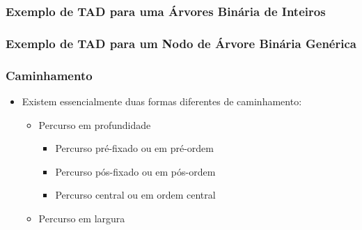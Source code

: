\documentclass[aspectratio=169]{beamer}
\begin{document}
\begin{frame}\frametitle{Exemplo de TAD para uma Árvores Binária de Inteiros}
\fontsize{3pt}{5pt}\selectfont{

}
\end{frame}

\begin{frame}[fragile]\frametitle{Exemplo de TAD para um Nodo de Árvore Binária Genérica}
\fontsize{3pt}{5pt}\selectfont{

}
\end{frame}

\begin{frame}\frametitle{Caminhamento}
\begin{itemize}
	\item Existem essencialmente duas formas diferentes de caminhamento:
	\begin{itemize}
		\item Percurso em profundidade
		\begin{itemize}
			\item Percurso pré-fixado ou em pré-ordem
			\item Percurso pós-fixado ou em pós-ordem
			\item Percurso central ou em ordem central
		\end{itemize}
		\item Percurso em largura
	\end{itemize}
\end{itemize}
\end{frame}
\end{document}
